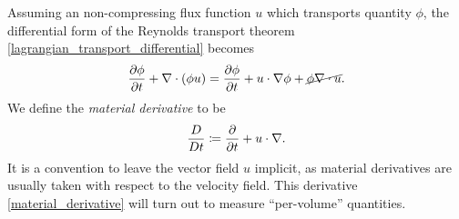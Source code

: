 Assuming an non-compressing flux function $u$ which transports quantity $\phi$, the differential form of the Reynolds transport theorem
\eqref{lagrangian_transport_differential} becomes
\begin{equation}
    \frac{\partial \phi}{\partial t} + \nabla\cdot(\phi u) = \frac{\partial \phi}{\partial t} + u\cdot\nabla\phi + \cancel{\phi \nabla\cdot u}.
\end{equation}
We define the \textit{material derivative} to be
\begin{equation}\label{material_derivative}
    \frac{D}{Dt} \coloneqq \frac{\partial }{\partial t} + u\cdot\nabla.
\end{equation}
It is a convention to leave the vector field $u$ implicit, as material derivatives are usually taken with respect to the velocity field.
This derivative \eqref{material_derivative} will turn out to measure ``per-volume'' quantities.

